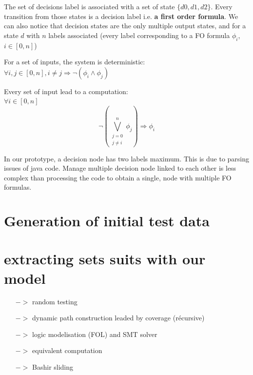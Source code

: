 \documentclass[a4paper]{report}
\begin{document}
\begin{NB}
The set of decisions label is associated with a set of state $\{d0, d1, d2\}$. Every transition from those states is a decision label i.e. \textbf{a first order formula}. We can also notice that decision states are the only multiple output states, and for a state $d$ with $n$ labels associated (every label corresponding to a FO formula $\phi_i$, $i\in[0, n]$)\\
\newline

\begin{lemma}
For a set of inputs, the system is deterministic:\\
$\forall i, j \in [0, n], i \neq j \Rightarrow \neg (\phi_i \wedge \phi_j)$\\
\end{lemma}

\begin{lemma}
Every set of input lead to a computation:\\
$\forall i \in [0, n] $\\
\[\displaystyle \neg (\bigvee_{\substack{j=0 \\ j \neq i}}^{n} \phi_j) \Rightarrow \phi_i \]
\end{lemma}

\end{NB}


\begin{remark}
In our prototype, a decision node has two labels maximum. This is due to parsing issues of java code. Manage multiple decision node linked to each other is less complex than processing the code to obtain a single, node with multiple FO formulas.
\end{remark}


\section*{Generation of initial test data}




\section*{extracting sets suits with our model}

\begin{itemize}
\item[$->$] random testing
\item[$->$] dynamic path construction leaded by coverage (récursive)
\item[$->$] logic modelisation (FOL) and SMT solver
\item[$->$] equivalent computation
\item[$->$] Bashir sliding
\end{itemize}
\end{document}
